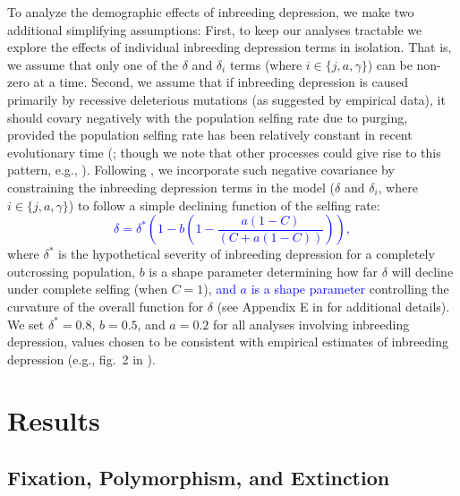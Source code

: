 \documentclass[11pt]{article}
\begin{document}
To analyze the demographic effects of inbreeding depression, we make two additional simplifying assumptions: First, to keep our analyses tractable we explore the effects of individual inbreeding depression terms in isolation. That is, we assume that only one of the $\delta$ and $\delta_i$ terms (where $i \in \{j,a,\gamma\}$) can be non-zero at a time. Second, we assume that if inbreeding depression is caused primarily by recessive deleterious mutations (as suggested by empirical data), it should covary negatively with the population selfing rate due to purging, provided the population selfing rate has been relatively constant in recent evolutionary time (\citealt{Charlesworth2009}; though we note that other processes could give rise to this pattern, e.g., \citealt{CrnokrakBarrett2002, Charlesworth2009,HedrickGarcia-Dorado2016}). Following \citet{Olito2019}, we incorporate such negative covariance by constraining the inbreeding depression terms in the model ($\delta$ and $\delta_i$, where $i \in \{j,a,\gamma\}$) to follow a simple declining function of the selfing rate: \textcolor{blue}{
\begin{equation}
  \delta = \delta^{\ast} \left(1 - b \left(1 - \frac{a(1 - C)}{(C + a(1 - C))}\right)\right),
  \label{eq:Canddelta}
\end{equation}}
where $\delta^{\ast}$ is the hypothetical severity of inbreeding depression for a completely outcrossing population, $b$ is a shape parameter determining how far $\delta$ will decline under complete selfing (when $C = 1$), \textcolor{blue}{and $a$ is a shape parameter} controlling the curvature of the overall function for $\delta$ (see Appendix E in \citealt{Olito2019} for additional details). We set $\delta^{\ast} = 0.8$, $b = 0.5$, and $a = 0.2$ for all analyses involving inbreeding depression, values chosen to be consistent with empirical estimates of inbreeding depression (e.g., fig.~2 in \citealt{HusbandSchemske1996}). 





\section*{Results}\label{sec:Results}

\subsection*{Fixation, Polymorphism, and Extinction}\label{subsec:PolyExt}
\end{document}
